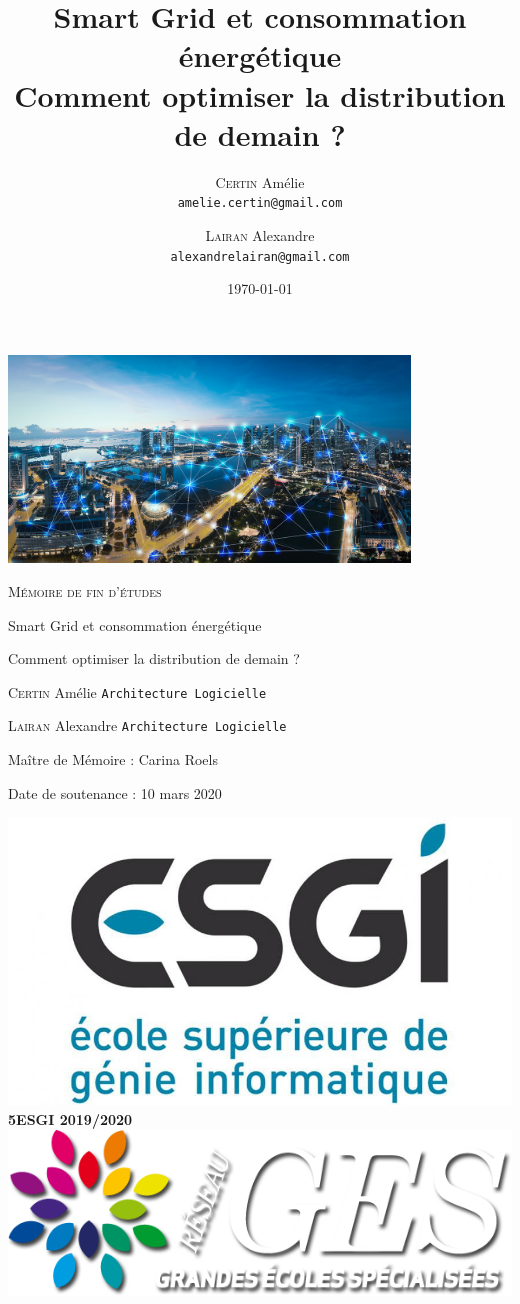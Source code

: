 \documentclass[12pt,french,a4paper,openany,twoside]{report}
\title{\textbf{Smart Grid et consommation énergétique} \\ Comment optimiser la distribution de demain ?}
\author{
  \textsc{Certin} Amélie\\
  \texttt{amelie.certin@gmail.com}
  \and
  \textsc{Lairan} Alexandre\\
  \texttt{alexandrelairan@gmail.com}
}
\date{\today}
\begin{document}
  \begin{titlepage}
    \centering
    \vskip -10cm
    \includegraphics[width=0.8\textwidth]{media/header_main.jpg}\par\vspace{0.1cm}
    {\scshape\LARGE Mémoire de fin d’études \par}
    {\LARGE Smart Grid et consommation énergétique \par}
    {\Large Comment optimiser la distribution de demain ? \par}

    \vfill

    \raggedright
    \textsc{Certin} Amélie
    \texttt{Architecture Logicielle}

    \textsc{Lairan} Alexandre
    \texttt{Architecture Logicielle}

    Maître de Mémoire : Carina Roels

    Date de soutenance : 10 mars 2020

    \vfill

    \begin{center}
      \includegraphics[scale=0.14]{media/esgi_logo.jpg}
      \LARGE \textbf{5ESGI 2019/2020}
      \includegraphics[scale=0.22]{media/logo_ges.png}
    \end{center}
  \end{titlepage}

  \maketitle
  \tableofcontents
  
  
  
\end{document}
